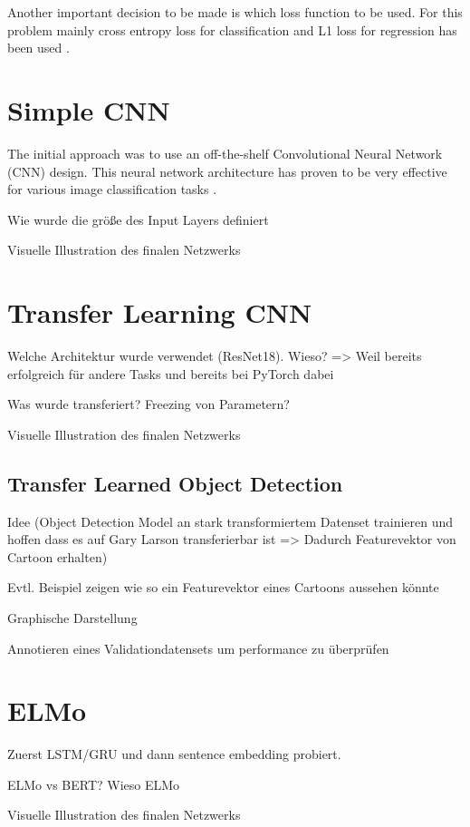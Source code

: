 \documentclass[draft,final,oneside]{vutinfth} %
\begin{document}
Another important decision to be made is which loss function to be used. For this problem mainly cross entropy loss for classification and L1 loss for regression has been used \cite{crossentropyloss} \cite{lossfunctions}.

\section{Simple CNN}

The initial approach was to use an off-the-shelf Convolutional Neural Network (CNN) design. This neural network architecture has proven to be very effective for various image classification tasks \cite{dogsvscats}.

Wie wurde die größe des Input Layers definiert

Visuelle Illustration des finalen Netzwerks

\section{Transfer Learning CNN}

Welche Architektur wurde verwendet (ResNet18). Wieso? => Weil bereits erfolgreich für andere Tasks und bereits bei PyTorch dabei

Was wurde transferiert? Freezing von Parametern?

Visuelle Illustration des finalen Netzwerks

\subsection{Transfer Learned Object Detection}

Idee (Object Detection Model an stark transformiertem Datenset trainieren und hoffen dass es auf Gary Larson transferierbar ist => Dadurch Featurevektor von Cartoon erhalten)

Evtl. Beispiel zeigen wie so ein Featurevektor eines Cartoons aussehen könnte

Graphische Darstellung

Annotieren eines Validationdatensets um performance zu überprüfen

\section{ELMo}
Zuerst LSTM/GRU und dann sentence embedding probiert.

ELMo vs BERT? Wieso ELMo

Visuelle Illustration des finalen Netzwerks
\end{document}
